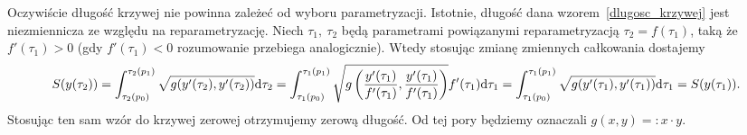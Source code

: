 Oczywiście 
długość krzywej nie powinna zależeć od wyboru parametryzacji.
Istotnie, długość dana wzorem~\eqref{dlugosc_krzywej}
jest niezmiennicza ze względu na reparametryzację.
Niech $\tau_1,\ \tau_2$ będą parametrami powiązanymi 
reparametryzacją $\tau_2 = f(\tau_1)$, taką że 
$f'(\tau_1) > 0$ (gdy $f'(\tau_1) <0$ rozumowanie 
przebiega analogicznie).
Wtedy stosując zmianę zmiennych całkowania dostajemy
\begin{align*}
S(y(\tau_2)) = 
\int_{\tau_2(p_0)}^{\tau_2(p_1)} \sqrt{g (
y' (\tau_2), y' (\tau_2) )} \text{d} \tau_2  = 
\int_{\tau_1(p_0)}^{\tau_1(p_1)} \sqrt{g \left(
\frac{ y' (\tau_1) }{ f'(\tau_1)}, 
\frac{ y' (\tau_1) }{ f'(\tau_1)} \right)} 
f'(\tau_1) \text{d} \tau_1  = 
\int_{\tau_1(p_0)}^{\tau_1(p_1)} \sqrt{g (
y' (\tau_1), y' (\tau_1)  )} \text{d} \tau_1  
=S(y(\tau_1)).
\end{align*}
Stosując ten sam wzór do krzywej zerowej otrzymujemy zerową
długość. Od tej pory będziemy oznaczali $g(x,y) =: x\cdot y$.

